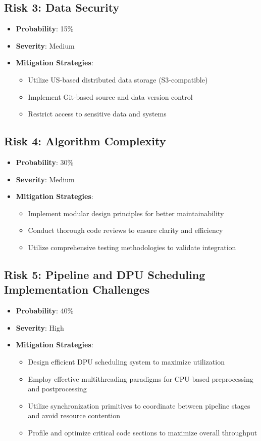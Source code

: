 \subsection{Risk 3: Data Security}
\begin{itemize}
\item \textbf{Probability}: 15\%
\item \textbf{Severity}: Medium
\item \textbf{Mitigation Strategies}:
  \begin{itemize}
  \item Utilize US-based distributed data storage (S3-compatible)
  \item Implement Git-based source and data version control
  \item Restrict access to sensitive data and systems
  \end{itemize}
\end{itemize}

\subsection{Risk 4: Algorithm Complexity}
\begin{itemize}
\item \textbf{Probability}: 30\%
\item \textbf{Severity}: Medium
\item \textbf{Mitigation Strategies}:
  \begin{itemize}
  \item Implement modular design principles for better maintainability
  \item Conduct thorough code reviews to ensure clarity and efficiency
  \item Utilize comprehensive testing methodologies to validate integration
  \end{itemize}
\end{itemize}

\subsection{Risk 5: Pipeline and DPU Scheduling Implementation Challenges}
\begin{itemize}
\item \textbf{Probability}: 40\%
\item \textbf{Severity}: High
\item \textbf{Mitigation Strategies}:
  \begin{itemize}
  \item Design efficient DPU scheduling system to maximize utilization
  \item Employ effective multithreading paradigms for CPU-based preprocessing and postprocessing
  \item Utilize synchronization primitives to coordinate between pipeline stages and avoid resource contention
  \item Profile and optimize critical code sections to maximize overall throughput
  \end{itemize}
\end{itemize}

